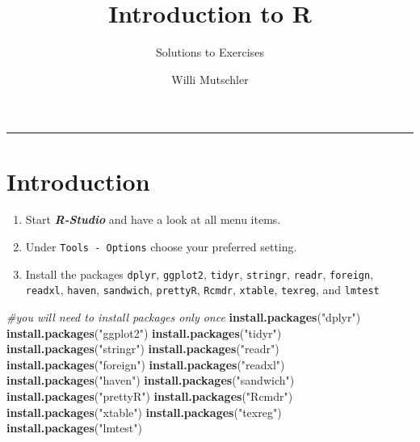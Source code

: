 \documentclass[]{article}
\title{Introduction to R}
\subtitle{Solutions to Exercises}
\author{Willi Mutschler}
\date{}
\newenvironment{Shaded}{\begin{snugshade}}{\end{snugshade}}
\newcommand{\KeywordTok}[1]{\textcolor[rgb]{0.13,0.29,0.53}{\textbf{#1}}}
\newcommand{\StringTok}[1]{\textcolor[rgb]{0.31,0.60,0.02}{#1}}
\newcommand{\CommentTok}[1]{\textcolor[rgb]{0.56,0.35,0.01}{\textit{#1}}}
\newcommand{\NormalTok}[1]{#1}
\begin{document}
\maketitle

{
\setcounter{tocdepth}{2}
\tableofcontents
}
\begin{center}\rule{0.5\linewidth}{\linethickness}\end{center}

\section{Introduction}\label{introduction}

\begin{enumerate}
\def\labelenumi{\arabic{enumi}.}
\item
  Start \textbf{\emph{R-Studio}} and have a look at all menu items.
\item
  Under \texttt{Tools\ -\ Options} choose your preferred setting.
\item
  Install the packages \texttt{dplyr}, \texttt{ggplot2}, \texttt{tidyr},
  \texttt{stringr}, \texttt{readr}, \texttt{foreign}, \texttt{readxl},
  \texttt{haven}, \texttt{sandwich}, \texttt{prettyR}, \texttt{Rcmdr},
  \texttt{xtable}, \texttt{texreg}, and \texttt{lmtest}
\end{enumerate}

\begin{Shaded}
\begin{Highlighting}[]
\CommentTok{#you will need to install packages only once}
\KeywordTok{install.packages}\NormalTok{(}\StringTok{"dplyr"}\NormalTok{)}
\KeywordTok{install.packages}\NormalTok{(}\StringTok{"ggplot2"}\NormalTok{)}
\KeywordTok{install.packages}\NormalTok{(}\StringTok{"tidyr"}\NormalTok{)}
\KeywordTok{install.packages}\NormalTok{(}\StringTok{"stringr"}\NormalTok{)}
\KeywordTok{install.packages}\NormalTok{(}\StringTok{"readr"}\NormalTok{)}
\KeywordTok{install.packages}\NormalTok{(}\StringTok{"foreign"}\NormalTok{)}
\KeywordTok{install.packages}\NormalTok{(}\StringTok{"readxl"}\NormalTok{)}
\KeywordTok{install.packages}\NormalTok{(}\StringTok{"haven"}\NormalTok{)}
\KeywordTok{install.packages}\NormalTok{(}\StringTok{"sandwich"}\NormalTok{)}
\KeywordTok{install.packages}\NormalTok{(}\StringTok{"prettyR"}\NormalTok{)}
\KeywordTok{install.packages}\NormalTok{(}\StringTok{"Rcmdr"}\NormalTok{)}
\KeywordTok{install.packages}\NormalTok{(}\StringTok{"xtable"}\NormalTok{)}
\KeywordTok{install.packages}\NormalTok{(}\StringTok{"texreg"}\NormalTok{)}
\KeywordTok{install.packages}\NormalTok{(}\StringTok{"lmtest"}\NormalTok{)}
\end{Highlighting}
\end{Shaded}
\end{document}
